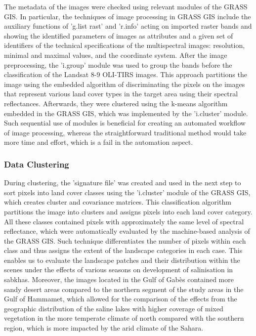 \documentclass[land,article,accept,pdftex,moreauthors]{Definitions/mdpi}
\begin{document}
The metadata of the images were checked using relevant modules of the GRASS GIS. In particular, the techniques of image processing in GRASS GIS include the auxiliary functions of 'g.list rast' and 'r.info' acting on imported raster bands and showing the identified parameters of images as attributes and a given set of identifiers of {the }technical specifications of the multispectral images: resolution, minimal and maximal values, and the coordinate system. After {the }image preprocessing, the 'i.group' module was used to group the bands before the classification of the Landsat {8-9 OLI-TIRS }images. This approach partitions the image using the embedded algorithm of discriminating the pixels on the images that represent various land cover types in the target area using their spectral reflectances. Afterwards, they were clustered using the k-means algorithm embedded in the GRASS GIS, which was implemented by the 'i.cluster' module. {Such sequential use of modules is beneficial for creating an automated workflow of image processing, whereas the straightforward traditional method would take more time and effort, which is a fail in the automation aspect. }

\subsubsection{Data Clustering}

During clustering, {the} 'signature file' was created {and} used in the next step to sort pixels into {land} cover classes using {the }'i.cluster' module of the GRASS GIS, which creates cluster and covariance matrices. {This classification algorithm partitions the image into clusters and assigns pixels into each land cover category. }All {these }classes contained pixels with approximately the same level of spectral reflectance, which {were} automatically evaluated by the {machine-based} analysis of the GRASS GIS{. Such technique differentiates the} number of pixels within each class and thus {assigns the} extent of {the }landscape categories {in each case. This enables us} to evaluate the {landscape }patches and their distribution within the scenes under the effects of various seasons on development of salinisation in sabkhas. Moreover, the images located in the Gulf of Gabès contained more sandy desert areas compared to the northern segment of the study areas in the Gulf of Hammamet, which allowed for the comparison of the effects from the geographic distribution of the saline lakes with higher coverage of mixed vegetation in the more temperate climate of north compared with the southern region, which is more impacted by the arid climate of the Sahara.
\end{document}
